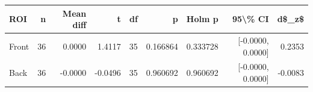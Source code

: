 \begin{tabular}{lrrrrrrrr}
\toprule
ROI & n & Mean diff & t & df & p & Holm p & 95\textbackslash{}\% CI & d\$\_z\$\\
\midrule
Front & 36 & 0.0000 & 1.4117 & 35 & 0.166864 & 0.333728 & [-0.0000, 0.0000] & 0.2353\\
Back & 36 & -0.0000 & -0.0496 & 35 & 0.960692 & 0.960692 & [-0.0000, 0.0000] & -0.0083\\
\bottomrule
\end{tabular}
